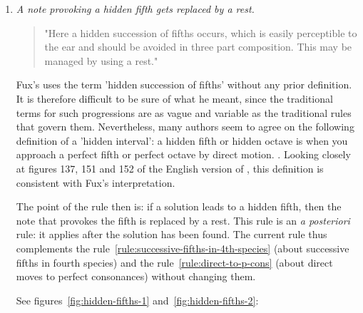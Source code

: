 \begin{enumerate}[wide, label=\bfseries 4.P\arabic*]
    \item \textit{A note provoking a hidden fifth gets replaced by a rest.} \label{rule:hidden-fifths}
    \begin{quotation}
        "Here a hidden succession of fifths occurs, which is easily perceptible to the ear and should be avoided in three part composition. This may be managed by using a rest."
        \textcite[p.98]{GaPEng}
    \end{quotation}
    Fux's uses the term 'hidden succession of fifths' without any prior definition. It is therefore difficult to be sure of what he meant, since the traditional terms for such progressions are as vague and variable as the traditional rules that govern them. Nevertheless, many authors seem to agree on the following definition of a 'hidden interval': a hidden fifth or hidden octave is when you approach a perfect fifth or perfect octave by direct motion. \cite[p.31]{piston1987harmony}. Looking closely at figures 137, 151 and 152 of the English version of \gap, this definition is consistent with Fux's interpretation.

    The point of the rule then is: if a solution leads to a hidden fifth, then the note that provokes the fifth is replaced by a rest. This rule is an \textit{a posteriori} rule: it applies after the solution has been found.
    The current rule thus complements the rule~\ref{rule:successive-fifths-in-4th-species} (about successive fifths in fourth species) and the rule~\ref{rule:direct-to-p-cons} (about direct moves to perfect consonances) without changing them.
    
    See figures~\ref{fig:hidden-fifths-1} and~\ref{fig:hidden-fifths-2}:


\end{enumerate}
